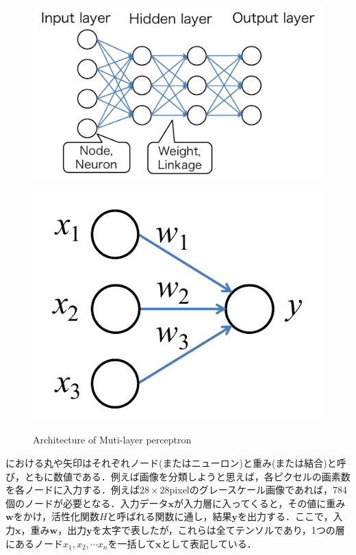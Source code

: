\begin{figure}[H]
	\centering
	\begin{minipage}[b]{0.4\columnwidth}
		\centering
		\includegraphics[width=1.2\linewidth]{figure/chapter2/MLP}
		\label{fig:mlp}
	\end{minipage}
	\begin{minipage}[b]{0.4\columnwidth}
		\centering
		\includegraphics[width=0.7\linewidth]{figure/chapter2/simple_perceptron}
		\label{fig:perceptron}
	\end{minipage}
	\caption{Architecture of Muti-layer perceptron}
\end{figure}

における丸や矢印はそれぞれノード(またはニューロン)と重み(または結合)と呼び，ともに数値である．例えば画像を分類しようと思えば，各ピクセルの画素数を各ノードに入力する．例えば$28 \times 28$pixelのグレースケール画像であれば，784個のノードが必要となる．入力データ$\bm {x}$が入力層に入ってくると，その値に重み$\bm {w}$をかけ，活性化関数$H$と呼ばれる関数に通し，結果$\bm{y}$を出力する．ここで，入力$\bm{x}$，重み$\bm{w}$，出力$\bm{y}$を太字で表したが，これらは全てテンソルであり，1つの層にあるノード$x_1, x_2, \cdots x_n$を一括して$\bm {x}$として表記している．

